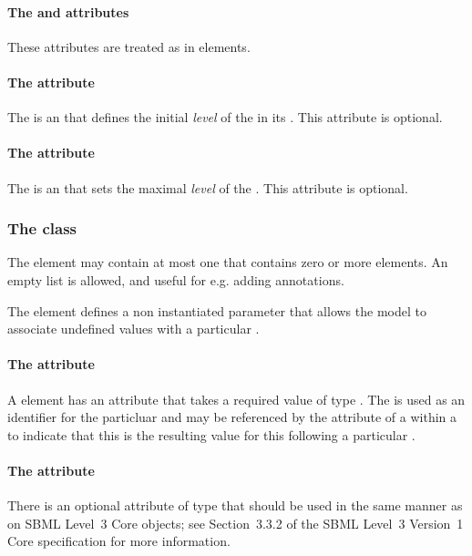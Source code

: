 \paragraph{The  and  attributes}
These attributes are treated as in  elements. 

\paragraph{The   attribute}
The  is an  that defines the initial \emph{level} of the \QualitativeSpecies in its . This attribute is optional.

\paragraph{The  attribute}
The  is an  that sets the maximal \emph{level} of the . This attribute is optional.

\subsubsection{The  class}
The \QualitativeSpecies element may contain at most one \ListOfSymbolicValues that contains zero or more \SymbolicValue elements. An empty list is allowed, and useful for e.g. adding annotations.

The \SymbolicValue element defines a non instantiated parameter that allows the model to associate undefined values with a particular \QualitativeSpecies.

\paragraph{The  attribute}
A \SymbolicValue element has an  attribute that takes a required value
of type . The  is used as an identifier for the particluar \SymbolicValue and may be referenced by the  attribute of a \FunctionTerm within a \Transition to indicate that this \SymbolicValue is the resulting value for this \QualitativeSpecies following a particular \Transition.

\paragraph{The  attribute}
There is an optional  attribute of type  that should be used
in the same manner as on SBML Level~3 Core
objects; see Section~3.3.2 of the SBML Level~3 Version~1 Core
specification for more information.


